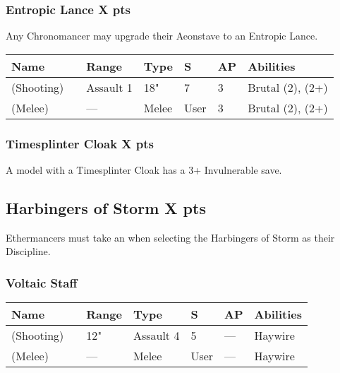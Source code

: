 \subsubsection[Entropic Lance ]{Entropic Lance  \hrulefill X pts} \label{Entropic Lance}

Any Chronomancer may upgrade their Aeonstave to an Entropic Lance.

\noindent
\begin{tabular}{||m{130pt} m{10pt} m{31pt} m{55pt} m{12pt} m{12pt} m{210pt}||}
	\hline
	Name & & Range & Type & S & AP & Abilities \\
	\hline
	\quickref{Entropic Lance} (Shooting) & & Assault 1 & 18" & 7 & 3 & Brutal (2), \quickref{Entropic Strike} (2+) \\
	\quickref{Entropic Lance} (Melee) & & — & Melee & User & 3 & Brutal (2), \quickref{Entropic Strike} (2+) \\
	\hline
\end{tabular}

\subsubsection[Timesplinter Cloak ]{Timesplinter Cloak  \hrulefill X pts}

A model with a Timesplinter Cloak has a 3+ Invulnerable save.



\subsection[Harbingers of Storm ]{Harbingers of Storm  \hrulefill X pts}

Ethermancers must take an  when selecting the Harbingers of Storm as their Discipline.

\subsubsection{Voltaic Staff}
\label{Voltaic Staff}
\noindent
\begin{tabular}{||m{130pt} m{10pt} m{31pt} m{55pt} m{12pt} m{12pt} m{210pt}||}
	\hline
	Name & & Range & Type & S & AP & Abilities \\
	\hline
	\quickref{Voltaic Staff} (Shooting) & & 12" & Assault 4 & 5 & — & Haywire \\
	\quickref{Voltaic Staff} (Melee) & & — & Melee & User & — & Haywire \\
	\hline
\end{tabular}

